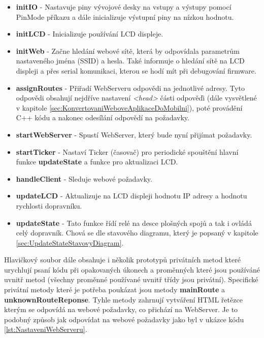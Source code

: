 \begin{itemize}
	\item \textbf{initIO} - Nastavuje piny vývojové desky na vstupy a výstupy pomocí PinMode příkazu a dále inicializuje výstupní piny na nízkou hodnotu.
	\item \textbf{initLCD} - Inicializuje používání LCD displeje.
	\item \textbf{initWeb} - Začne hledání webové sítě, která by odpovídala parametrům nastaveného jména (SSID) a hesla. Také informuje o hledání sítě na LCD displeji a přes serial komunikaci, kterou se hodí mít při debugování firmware.
	\item \textbf{assignRoutes} - Přiřadí WebServeru odpovědi na jednotlivé adresy. Tyto odpovědi obsahují nejdříve nastavení \textit{<head>} části odpověďi (dále vysvětlené v kapitole \ref{sec:KonvertovaniWeboveAplikaceDoMobilni}), poté provádění C++ kódu a nakonec odesílání odpovědí na požadavky.
	\item \textbf{startWebServer} - Spustí WebServer, který bude nyní přijímat požadavky.
	\item \textbf{startTicker} - Nastaví Ticker (časovač) pro periodické spouštění hlavní funkce \textbf{updateState} a funkce pro aktualizaci LCD.
	\item \textbf{handleClient} - Sleduje webové požadavky.
	\item \textbf{updateLCD} - Aktualizuje na LCD displeji hodnotu IP adresy a hodnotu rychlosti dopravníku.
	\item \textbf{updateState} - Tato funkce řídí relé na desce plošných spojů a tak i ovládá celý dopravník. Chová se dle stavového diagramu, který je popsaný v kapitole \ref{sec:UpdateStateStavovyDiagram}.
\end{itemize}

Hlavičkový soubor dále obsahuje i několik prototypů privátních metod které urychlují psaní kódu při opakovaných úkonech a proměnných které jsou používáné uvnitř metod (všechny proměnné používané uvnitř třídy jsou privátní). Specifické privátní metody které je potřeba poukázat jsou metody \textbf{mainRoute} a \textbf{unknownRouteReponse}. Tyhle metody zahrnují vytváření HTML řetězce kterým se odpovídá na webové požadavky, co přichází na WebServer. Je to podobný způsob jak odpovídat na webové požadavky jako byl v ukázce kódu \ref{lst:NastaveniWebServeru}.

\oldtext

